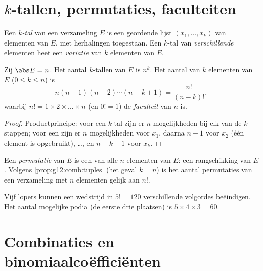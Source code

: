 \section{\texorpdfstring{$k$-tallen}{k-tallen}, permutaties, faculteiten}

\begin{definition}[$k$-tallen]\label{def:g12:comb:tuples}
Een \emph{$k$-tal} van een verzameling $E$ is een geordende lijst
$(x_1, \dots, x_k)$ van elementen van $E$, met herhalingen toegestaan. Een
$k$-tal van \emph{verschillende} elementen heet een
\emph{variatie} van $k$ elementen van $E$.
\end{definition}

\begin{proposition}\label{prop:g12:comb:tuples}
Zij $\abs E = n$. Het aantal $k$-tallen van $E$ is $n^k$. Het aantal
 van $k$ elementen van $E$ ($0 \leq k \leq n$) is
\[
n(n-1)(n-2)\cdots(n-k+1) = \frac{n!}{(n-k)!},
\]
waarbij $n! = 1 \times 2 \times \dots \times n$ (en $0! = 1$) de
\emph{faculteit} van $n$ is.
\end{proposition}

\begin{proof}
Productprincipe: voor een $k$-tal zijn er $n$ mogelijkheden bij elk van de
$k$ stappen; voor een  zijn er $n$ mogelijkheden voor $x_1$, daarna
$n - 1$ voor $x_2$ (één element is opgebruikt), \dots, en $n - k + 1$ voor
$x_k$.
\end{proof}

\begin{definition}[Permutatie]\label{def:g12:comb:permutation}
Een \emph{permutatie} van $E$ is een  van alle $n$
elementen van $E$: een rangschikking van $E$. Volgens
\cref{prop:g12:comb:tuples} (het geval $k = n$) is het aantal permutaties van
een verzameling met $n$ elementen gelijk aan $n!$.
\end{definition}

\begin{example}
Vijf lopers kunnen een wedstrijd in $5! = 120$ verschillende volgordes
beëindigen. Het aantal mogelijke podia (de eerste drie plaatsen) is
$5 \times 4 \times 3 = 60$.
\end{example}

\section{Combinaties en binomiaalcoëfficiënten}

